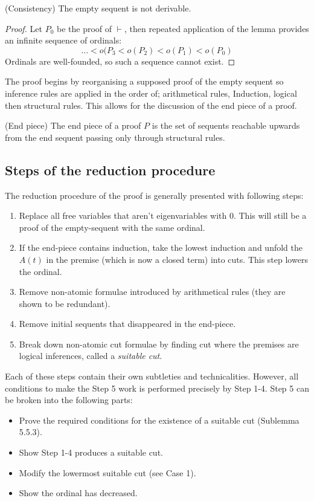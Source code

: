 \begin{cththeorem}{(Consistency)}
    The empty sequent is not derivable.
\end{cththeorem}
\begin{proof}
    Let $P_0$ be the proof of $\vdash$, then repeated application of the lemma provides an infinite sequence of ordinals:
    \[ \dots < o(P_{3} < o(P_{2}) < o(P_1) < o(P_0) \]
    Ordinals are well-founded, so such a sequence cannot exist.
\end{proof}

The proof begins by reorganising a supposed proof of the empty sequent so inference rules are applied in the order of; arithmetical rules, Induction, logical then structural rules. This allows for the discussion of the end piece of a proof.

\begin{cthdefinition}{(End piece)}
    The end piece of a proof $P$ is the set of sequents reachable upwards from the end sequent passing only through structural rules.
\end{cthdefinition}

\subsection{Steps of the reduction procedure}
The reduction procedure of the proof is generally presented with following steps:

\begin{enumerate}
    \item Replace all free variables that aren't eigenvariables with $0$. This will still be a proof of the empty-sequent with the same ordinal.
    \item If the end-piece contains induction, take the lowest induction and unfold the $A(t)$ in the premise (which is now a closed term) into cuts. This step lowers the ordinal.
    \item Remove non-atomic formulae introduced by arithmetical rules (they are shown to be redundant). 
    \item Remove initial sequents that disappeared in the end-piece.
    \item Break down non-atomic cut formulae by finding cut where the premises are logical inferences, called a \emph{suitable cut}.
\end{enumerate}

Each of these steps contain their own subtleties and technicalities. However, all conditions to make the Step 5 work is performed precisely by Step 1-4. Step 5 can be broken into the following parts:
\begin{itemize}
    \item Prove the required conditions for the existence of a suitable cut (Sublemma 5.5.3).
    \item Show Step 1-4 produces a suitable cut.
    \item Modify the lowermost suitable cut (see Case 1).
    \item Show the ordinal has decreased.
\end{itemize}

